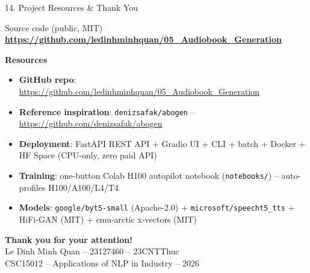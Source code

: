 \documentclass[10pt,aspectratio=169]{beamer}
\begin{document}
\begin{frame}{14. Project Resources \& Thank You}
\begin{block}{Source code (public, MIT)}
\centering
\large \textbf{\url{https://github.com/ledinhminhquan/05_Audiobook_Generation}}
\end{block}

\textbf{Resources}
\begin{itemize}\scriptsize
  \item \textbf{GitHub repo}: \url{https://github.com/ledinhminhquan/05_Audiobook_Generation}
  \item \textbf{Reference inspiration}: \texttt{denizsafak/abogen} -- \url{https://github.com/denizsafak/abogen}
  \item \textbf{Deployment}: FastAPI REST API + Gradio UI + CLI + batch + Docker + HF Space (CPU-only, zero paid API)
  \item \textbf{Training}: one-button Colab H100 autopilot notebook (\texttt{notebooks/}) -- auto-profiles H100/A100/L4/T4
  \item \textbf{Models}: \texttt{google/byt5-small} (Apache-2.0) + \texttt{microsoft/speecht5\_tts} + HiFi-GAN (MIT) + cmu-arctic x-vectors (MIT)
\end{itemize}

\vspace{0.3cm}
\centering
\Large\textbf{Thank you for your attention!}\\[0.2cm]
\normalsize Le Dinh Minh Quan -- 23127460 -- 23CNTThuc \\
\small CSC15012 -- Applications of NLP in Industry -- 2026
\end{frame}
\end{document}
